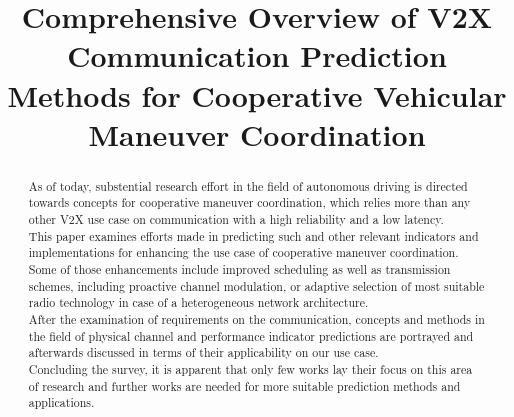 \documentclass[conference]{IEEEtran}
\begin{document}
%
\title{Comprehensive Overview of V2X Communication Prediction Methods for
Cooperative Vehicular Maneuver Coordination}


\author{
}


\maketitle


\begin{abstract}
As of today, substential research effort in the field of autonomous driving is directed towards concepts for cooperative maneuver coordination, which relies more than any other V2X use case on communication with a high reliability and a low latency.\\
This paper examines efforts made in predicting such and other relevant indicators and implementations for enhancing the use case of cooperative maneuver coordination. Some of those enhancements include improved scheduling as well as transmission schemes, including proactive channel modulation, or adaptive selection of most suitable radio technology in case of a heterogeneous network architecture.\\
After the examination of requirements on the communication, concepts and methods in the field of physical channel and performance indicator predictions are portrayed and afterwards discussed in terms of their applicability on our use case.\\
Concluding the survey, it is apparent that only few works lay their focus on this area of research and further works are needed for more suitable prediction methods and applications.
\end{abstract}
\end{document}
